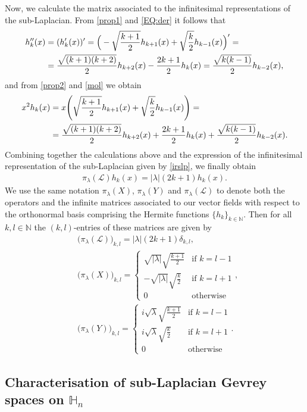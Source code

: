 \documentclass[12pt,oneside,a4paper]{book}
\numberwithin{equation}{section}     %
\theoremstyle{plain}
\theoremstyle{definition}
\newcommand{\N}{{\mathbb N}}
\newcommand{\h}{{\mathbb H}}
\newcommand{\slp}{{\mathcal L}}
\begin{document}
Now, we calculate the matrix associated to the infinitesimal representations of the sub-Laplacian. From \eqref{prop1} and \eqref{EQ:der} it follows that
\begin{align}\notag
h''_k(x)&=(h_k'(x))'=\Big(-\sqrt\frac{k+1}{2}h_{k+1}(x)+\sqrt{\frac{k}{2}}h_{k-1}(x)\Big)'=\\
\notag
&=\frac{\sqrt{(k+1)(k+2)}}{2}h_{k+2}(x)-\frac{2k+1}{2}h_k(x)=\frac{\sqrt{k(k-1)}}{2}h_{k-2}(x),\end{align}
and from \eqref{prop2} and \eqref{mol} we obtain
\begin{align}\notag
x^2h_k(x)&=x\Bigg(\sqrt{\frac{k+1}{2}}h_{k+1}(x)+\sqrt\frac{k}{2}h_{k-1}(x)\Bigg)=\\\notag
&=\frac{\sqrt{(k+1)(k+2)}}{2}h_{k+2}(x)+\frac{2k+1}{2}h_k(x)+\frac{\sqrt{k(k-1)}}{2}h_{k-2}(x).
\end{align}
Combining together the calculations above and the expression of the infinitesimal representation of the sub-Laplacian given by \eqref{irslp}, we finally obtain
\begin{align}
\pi_{\lambda}(\slp)h_k(x)=|\lambda|(2k+1)h_k(x).
\end{align}
We use the same notation $\pi_\lambda(X)$, $\pi_\lambda(Y)$ and $\pi_\lambda(\slp)$ to denote both the operators and the infinite matrices associated to our vector fields with respect to the orthonormal basis comprising the Hermite functions $\{h_k\}_{k\in\N}$. Then for all $k,l\in\N$ the $(k,l)$-entries of these matrices are given by
\begin{align}\label{matrix1}
&\big(\pi_\lambda(\slp)\big)_{k,l}=|\lambda|(2k+1)\delta_{k,l},\\\label{matrix2}
&\big(\pi_\lambda(X)\big)_{k,l}=
\begin{cases}
\sqrt{|\lambda|}\sqrt{\frac{k+1}{2}}&\text{if }k=l-1\\
-\sqrt{|\lambda|}\sqrt{\frac{k}{2}}&\text{if }k=l+1\\
0&\text{otherwise}
\end{cases},\\\label{matrix3}
&\big(\pi_\lambda(Y)\big)_{k,l}=
\begin{cases}
i\sqrt{\lambda}\sqrt{\frac{k+1}{2}}&\text{if }k=l-1\\
i\sqrt{\lambda}\sqrt{\frac{k}{2}}&\text{if }k=l+1\\
0&\text{otherwise}
\end{cases}.
\end{align}

\subsection{Characterisation of sub-Laplacian  Gevrey spaces on $\h_n$}\label{Hn}
\end{document}
